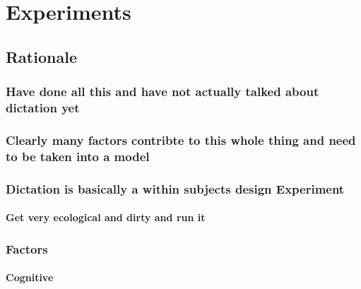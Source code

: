 \documentclass[]{book}
\theoremstyle{definition}
\theoremstyle{definition}
\theoremstyle{definition}
\theoremstyle{remark}
\begin{document}
\hypertarget{experiments}{%
\chapter{Experiments}\label{experiments}}

\hypertarget{rationale}{%
\section{Rationale}\label{rationale}}

\hypertarget{have-done-all-this-and-have-not-actually-talked-about-dictation-yet}{%
\subsection{Have done all this and have not actually talked about
dictation
yet}\label{have-done-all-this-and-have-not-actually-talked-about-dictation-yet}}

\hypertarget{clearly-many-factors-contribte-to-this-whole-thing-and-need-to-be-taken-into-a-model}{%
\subsection{Clearly many factors contribte to this whole thing and need
to be taken into a
model}\label{clearly-many-factors-contribte-to-this-whole-thing-and-need-to-be-taken-into-a-model}}

\hypertarget{dictation-is-basically-a-within-subjects-design-experiment}{%
\subsection{Dictation is basically a within subjects design
Experiment}\label{dictation-is-basically-a-within-subjects-design-experiment}}

\hypertarget{get-very-ecological-and-dirty-and-run-it}{%
\subsubsection{Get very ecological and dirty and run
it}\label{get-very-ecological-and-dirty-and-run-it}}

\hypertarget{factors}{%
\subsection{Factors}\label{factors}}

\hypertarget{cognitive-1}{%
\subsubsection{Cognitive}\label{cognitive-1}}
\end{document}
